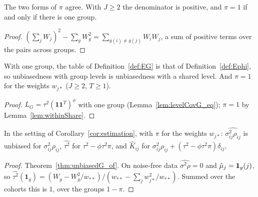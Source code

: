 \begin{lemma}\label{lem:withinShare}
  \leanok
  The two forms of $\pi$ agree. With $J \ge 2$ the denominator is positive,
  and $\pi = 1$ if and only if there is one group.
\end{lemma}
\begin{proof}
  \leanok
  $(\sum_j W_j)^2 - \sum_g W_g^2 = \sum_{g(i) \ne g(j)} W_iW_j$, a sum of
  positive terms over the pairs across groups.
\end{proof}

\begin{lemma}\label{lem:EG_const}
  \leanok
  With one group, the table of Definition~\ref{def:EG} is that of
  Definition~\ref{def:Ephi}, so unbiasedness with group levels is unbiasedness
  with a shared level. And $\pi = 1$ for the weights $w_{j*}$ ($J \ge 2$, $T \ge 1$).
\end{lemma}
\begin{proof}
  \leanok
  $L_G = \tau^2(\mathbf 1\mathbf 1^T)^\phi$ with one group (Lemma~\ref{lem:levelCovG_eq});
  $\pi = 1$ by Lemma~\ref{lem:withinShare}.
\end{proof}

\begin{theorem}\label{thm:estimation_G}
  \leanok
  In the setting of Corollary~\ref{cor:estimation}, with $\pi$ for the
  weights $w_{j*}$: $\widehat{\sigma^2_{ij}\rho_{ij}}$ is unbiased for
  $\sigma^2_{ij}\rho_{ij}$, $\widehat{\tau^2}$ for $\tau^2 - \phi\tau^2\pi$,
  and $\hat K_{ij}$ for $\sigma^2_{ij}\rho_{ij} + (\tau^2 - \phi\tau^2\pi)\delta_{ij}$.
\end{theorem}
\begin{proof}
  \leanok
  Theorem~\ref{thm:unbiasedG_of}. On noise-free data $\widehat{\sigma^2\rho} = 0$
  and $\hat\mu_j = \mathbf 1_g(j)$, so $\widehat{\tau^2}(\mathbf 1_g) =
  (W_g - W_g^2/w_{**})/(w_{**} - \sum_j w_{j*}^2/w_{**})$. Summed over the
  cohorts this is $1$, over the groups $1 - \pi$.
\end{proof}

